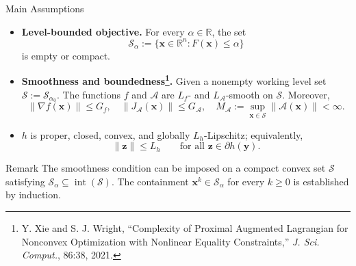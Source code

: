 \documentclass[handout,compress,9pt]{beamer}
\newcommand{\red}[1]{\textcolor{ddlred}{#1}}
\newcommand{\RR}{\mathbb{R}}
\newcommand{\bx}{\bm{x}}
\newcommand{\by}{\bm{y}}
\newcommand{\bz}{\bm{z}}
\newcommand{\calA}{\mathcal{A}}
\newcommand{\calS}{\mathcal{S}}
\begin{document}
\begin{frame}[t]{Main Assumptions}
\small
\vspace{0.15cm}

\begin{itemize}
\item[(i)] \textbf{Level-bounded objective.}
For every $\alpha\in\RR$, the set
\begin{equation*}
  \calS_{\alpha}:=\{\bx\in\RR^n:F(\bx)\leq\alpha\}
\end{equation*}
is empty or compact.

\item[(ii)] \textbf{Smoothness and boundedness\footnote{Y. Xie and S. J. Wright, ``Complexity of Proximal Augmented Lagrangian for Nonconvex Optimization with Nonlinear Equality Constraints,'' \emph{J. Sci. Comput.}, 86:38, 2021.}.}
Given a nonempty working level set $\calS:=\calS_{\alpha_0}$.
The functions $f$ and $\calA$ are $L_f$- and $L_{\calA}$-smooth on $\calS$.
Moreover,
\begin{equation*}
  \|\nabla f(\bx)\|\leq G_f,
  \quad \|J_{\calA}(\bx)\|\leq G_{\calA},
  \quad M_{\calA}:=\sup_{\bx\in\calS}\|\calA(\bx)\|<\infty.
\end{equation*}

\item[(iii)] $h$ is proper, closed, convex, and globally $L_h$-Lipschitz; equivalently,
\begin{equation*}
  \|\bz\|\leq L_h
  \qquad \text{for all }\bz\in\partial h(\by).
\end{equation*}
\end{itemize}

\vspace{0.15cm}
\begin{block}{Remark}
The smoothness condition can be imposed on a compact convex set $\calS$
satisfying $\calS_\alpha\subseteq\operatorname{int}(\calS)$.
The containment $\bx^k\in\calS_\alpha$ for every $k\ge0$ is
\red{established by induction}.
\hfill
\hyperlink{appendix:bootstrap-joint-claim}{%
}
\end{block}
\end{frame}
\end{document}
